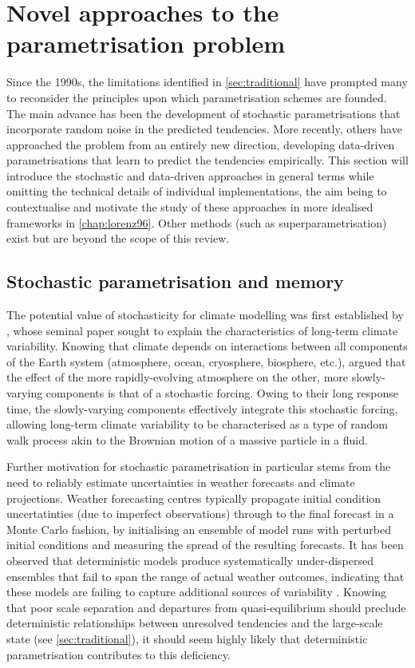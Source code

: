 \documentclass[../main.tex]{subfiles}
\begin{document}
\section{Novel approaches to the parametrisation problem}%
\label{sec:novel}
Since the 1990s, the limitations identified in \cref{sec:traditional} have
prompted many to reconsider the principles upon which parametrisation schemes
are founded. The main advance has been the development of stochastic
parametrisations that incorporate random noise in the predicted tendencies.
More recently, others have approached the problem from an entirely new
direction, developing data-driven parametrisations that learn to predict the
tendencies empirically. This section will introduce the stochastic and
data-driven approaches in general terms while omitting the technical details of
individual implementations, the aim being to contextualise and motivate the
study of these approaches in more idealised frameworks in \cref{chap:lorenz96}.
Other methods (such as superparametrisation) exist but are beyond the scope of
this review.


\subsection{Stochastic parametrisation and memory} \label{sec:stochastic}
The potential value of stochasticity for climate modelling was first
established by \textcite{hasselmann1976}, whose seminal paper sought to explain
the characteristics of long-term climate variability. Knowing that climate
depends on interactions between all components of the Earth system
(atmosphere, ocean, cryosphere, biosphere, etc.), \citeauthor{hasselmann1976}
argued that the effect of the more rapidly-evolving atmosphere on the other,
more slowly-varying components is that of a stochastic forcing. Owing to
their long response time, the slowly-varying components effectively integrate
this stochastic forcing, allowing long-term climate variability to be
characterised as a type of random walk process akin to the Brownian motion
of a massive particle in a fluid.

Further motivation for stochastic parametrisation in particular stems from the
need to reliably estimate uncertainties in weather forecasts and climate
projections. Weather forecasting centres typically propagate initial condition
uncertatinties (due to imperfect observations) through to the final forecast in
a Monte Carlo fashion, by initialising an ensemble of model runs with perturbed
initial conditions and measuring the spread of the resulting forecasts. It has
been observed that deterministic models produce systematically under-dispersed
ensembles that fail to span the range of actual weather outcomes, indicating
that these models are failing to capture additional sources of variability
\parencite{palmer2005,berner2017,palmer2019}. Knowing that poor scale
separation and departures from quasi-equilibrium should preclude deterministic
relationships between unresolved tendencies and the large-scale state (see
\cref{sec:traditional}), it should seem highly likely that deterministic
parametrisation contributes to this deficiency.
\end{document}
